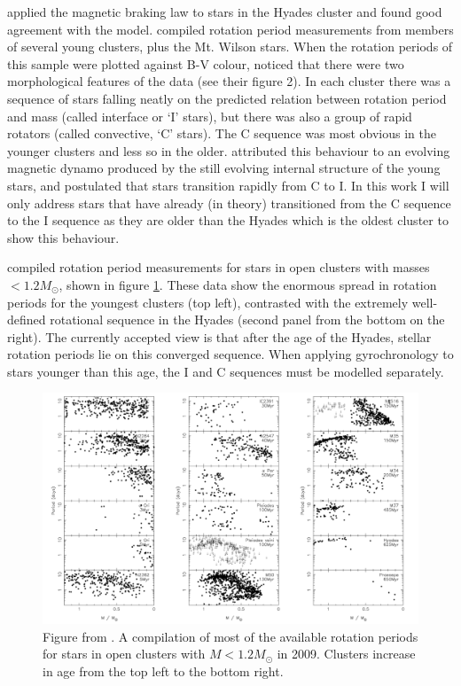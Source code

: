 \citet{Kawaler1989} applied the \citet{Kawaler1988} magnetic braking law to
stars in the Hyades cluster and found good agreement with the model.
\citet{Barnes2003} compiled rotation period measurements from members of
several young clusters, plus the Mt. Wilson stars.
When the rotation periods of this sample were plotted against B-V colour,
\citet{Barnes2003} noticed that there were two morphological features of the
data (see their figure 2).
In each cluster there was a sequence of stars falling neatly on the predicted
relation between rotation period and mass (called interface or `I' stars),
but there was also a group of rapid rotators (called convective, `C' stars).
The C sequence was most obvious in the younger clusters and less so in the
older.
\citet{Barnes2003} attributed this behaviour to an evolving magnetic dynamo
produced by the still evolving internal structure of the young stars, and
postulated that stars transition rapidly from C to I.
In this work I will only address stars that have already (in theory)
transitioned from the C sequence to the I sequence as they are older than the
Hyades which is the oldest cluster to show this behaviour.

\citet{Irwin2009} compiled rotation period measurements for stars in open
clusters with masses $< 1.2 M_\odot$, shown in figure \ref{fig:irwin}.
These data show the enormous spread in rotation periods for the youngest
clusters (top left), contrasted with the extremely well-defined rotational
sequence in the Hyades (second panel from the bottom on the right).
The currently accepted view is that after the age of the Hyades, stellar
rotation periods lie on this converged sequence.
When applying gyrochronology to stars younger than this age, the I and C
sequences must be modelled separately.
\begin{figure}[p]
\begin{center}
\includegraphics[width=6in, clip=true]{figures/irwin.pdf}
\caption[Cluster rotation from \citet{Irwin2009}]
{Figure from \citet{Irwin2009}. A compilation of most of the available
rotation periods for stars in open clusters with $M < 1.2 M_\odot$ in 2009.
Clusters increase in age from the top left to the bottom right.}
\label{fig:irwin}
\end{center}
\end{figure}


